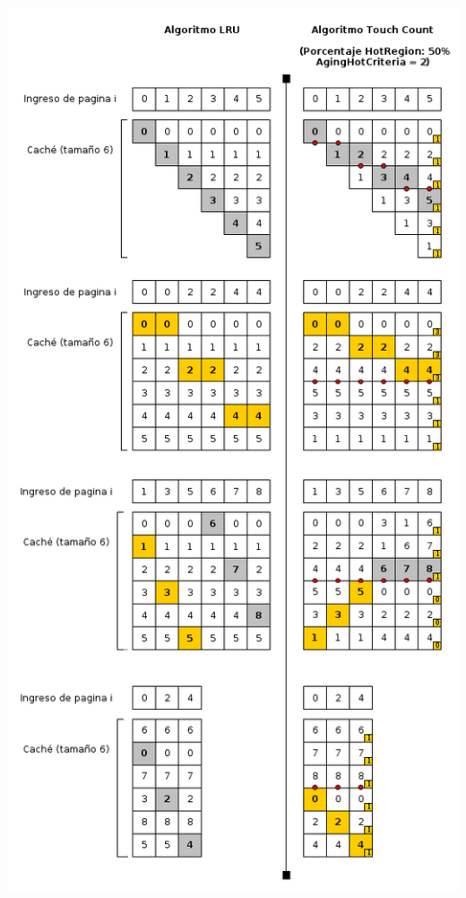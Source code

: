 \documentclass[11pt, a4paper, spanish]{article}
\begin{document}
	\begin{center}
		\includegraphics[scale=0.65]{diagramas/LRUvsTouchCountAll.png}\\
	\end{center}

\end{document}
